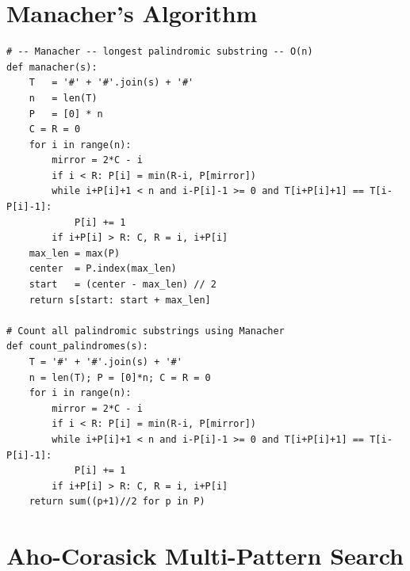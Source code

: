 \documentclass[11pt,a4paper]{report}
\begin{document}
\section{Manacher's Algorithm}

\begin{lstlisting}
# -- Manacher -- longest palindromic substring -- O(n)
def manacher(s):
    T   = '#' + '#'.join(s) + '#'
    n   = len(T)
    P   = [0] * n
    C = R = 0
    for i in range(n):
        mirror = 2*C - i
        if i < R: P[i] = min(R-i, P[mirror])
        while i+P[i]+1 < n and i-P[i]-1 >= 0 and T[i+P[i]+1] == T[i-P[i]-1]:
            P[i] += 1
        if i+P[i] > R: C, R = i, i+P[i]
    max_len = max(P)
    center  = P.index(max_len)
    start   = (center - max_len) // 2
    return s[start: start + max_len]

# Count all palindromic substrings using Manacher
def count_palindromes(s):
    T = '#' + '#'.join(s) + '#'
    n = len(T); P = [0]*n; C = R = 0
    for i in range(n):
        mirror = 2*C - i
        if i < R: P[i] = min(R-i, P[mirror])
        while i+P[i]+1 < n and i-P[i]-1 >= 0 and T[i+P[i]+1] == T[i-P[i]-1]:
            P[i] += 1
        if i+P[i] > R: C, R = i, i+P[i]
    return sum((p+1)//2 for p in P)
\end{lstlisting}

\section{Aho-Corasick Multi-Pattern Search}
\end{document}
